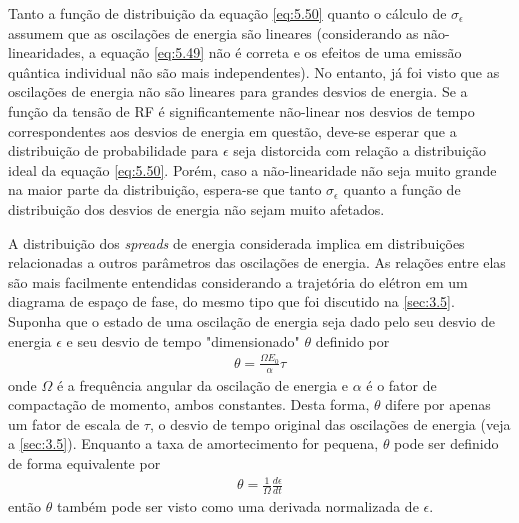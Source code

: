 Tanto a função de distribuição da equação \eqref{eq:5.50} quanto o cálculo de $\sigma_\epsilon$ assumem que as oscilações de energia são lineares (considerando as não-linearidades, a equação \eqref{eq:5.49} não é correta e os efeitos de uma emissão quântica individual não são mais independentes). No entanto, já foi visto que as oscilações de energia não são lineares para grandes desvios de energia. Se a função da tensão de RF é significantemente não-linear nos desvios de tempo correspondentes aos desvios de energia em questão, deve-se esperar que a distribuição de probabilidade para $\epsilon$ seja distorcida com relação a distribuição ideal da equação \eqref{eq:5.50}. Porém, caso a não-linearidade não seja muito grande na maior parte da distribuição, espera-se que tanto $\sigma_\epsilon$ quanto a função de distribuição dos desvios de energia não sejam muito afetados.

A distribuição dos \textit{spreads} de energia considerada implica em distribuições relacionadas a outros parâmetros das oscilações de energia. As relações entre elas são mais facilmente entendidas considerando a trajetória do elétron em um diagrama de espaço de fase, do mesmo tipo que foi discutido na \autoref{sec:3.5}. Suponha que o estado de uma oscilação de energia seja dado pelo seu desvio de energia $\epsilon$ e seu desvio de tempo "dimensionado" $\theta$ definido por
\begin{align}
	\theta = \frac{\Omega E_0}{\alpha}\tau\label{eq:5.52}
\end{align}
onde $\Omega$ é a frequência angular da oscilação de energia e $\alpha$ é o fator de compactação de momento, ambos constantes. Desta forma, $\theta$ difere por apenas um fator de escala de $\tau$, o desvio de tempo original das oscilações de energia (veja a \autoref{sec:3.5}). Enquanto a taxa de amortecimento for pequena, $\theta$ pode ser definido de forma equivalente por
\begin{align}
	\theta = \frac{1}{\Omega}\frac{d\epsilon}{dt}
\end{align}
então $\theta$ também pode ser visto como uma derivada normalizada de $\epsilon$.

